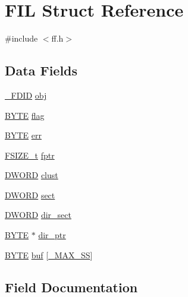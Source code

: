 \hypertarget{struct_f_i_l}{}\section{F\+IL Struct Reference}
\label{struct_f_i_l}


{\ttfamily \#include $<$ff.\+h$>$}

\subsection*{Data Fields}
\begin{DoxyCompactItemize}
\item 
\mbox{\hyperlink{struct___f_d_i_d}{\+\_\+\+F\+D\+ID}} \mbox{\hyperlink{struct_f_i_l_ae7242545ea88ea2602484122ebe65fa3}{obj}}
\item 
\mbox{\hyperlink{lz4_8c_a4ae1dab0fb4b072a66584546209e7d58}{B\+Y\+TE}} \mbox{\hyperlink{struct_f_i_l_ac409508881f5a16f2998ae675072b376}{flag}}
\item 
\mbox{\hyperlink{lz4_8c_a4ae1dab0fb4b072a66584546209e7d58}{B\+Y\+TE}} \mbox{\hyperlink{struct_f_i_l_aea440945db26de9c4a88065c0c887fda}{err}}
\item 
\mbox{\hyperlink{ff_8h_a3fc0992ad7436250b6b1a0592214b7f2}{F\+S\+I\+Z\+E\+\_\+t}} \mbox{\hyperlink{struct_f_i_l_a088b03ab2e02f82e10e17bdd938190a6}{fptr}}
\item 
\mbox{\hyperlink{integer_8h_ad342ac907eb044443153a22f964bf0af}{D\+W\+O\+RD}} \mbox{\hyperlink{struct_f_i_l_aa41312aba551b9a6d1c9d3c8c7d2734b}{clust}}
\item 
\mbox{\hyperlink{integer_8h_ad342ac907eb044443153a22f964bf0af}{D\+W\+O\+RD}} \mbox{\hyperlink{struct_f_i_l_affec18b48fe716fdae6a60123fc61145}{sect}}
\item 
\mbox{\hyperlink{integer_8h_ad342ac907eb044443153a22f964bf0af}{D\+W\+O\+RD}} \mbox{\hyperlink{struct_f_i_l_ab203794f939ad4480e81dfa488770783}{dir\+\_\+sect}}
\item 
\mbox{\hyperlink{lz4_8c_a4ae1dab0fb4b072a66584546209e7d58}{B\+Y\+TE}} $\ast$ \mbox{\hyperlink{struct_f_i_l_a5af9e9fb312b629220eaf684dd28c4a9}{dir\+\_\+ptr}}
\item 
\mbox{\hyperlink{lz4_8c_a4ae1dab0fb4b072a66584546209e7d58}{B\+Y\+TE}} \mbox{\hyperlink{struct_f_i_l_a7a95fb86588663e48309b5cded7e207b}{buf}} \mbox{[}\mbox{\hyperlink{ffconf_8h_ac271b697378912f17132cb9c7d0de024}{\+\_\+\+M\+A\+X\+\_\+\+SS}}\mbox{]}
\end{DoxyCompactItemize}


\subsection{Field Documentation}
\mbox{\label{struct_f_i_l_a7a95fb86588663e48309b5cded7e207b}} 

